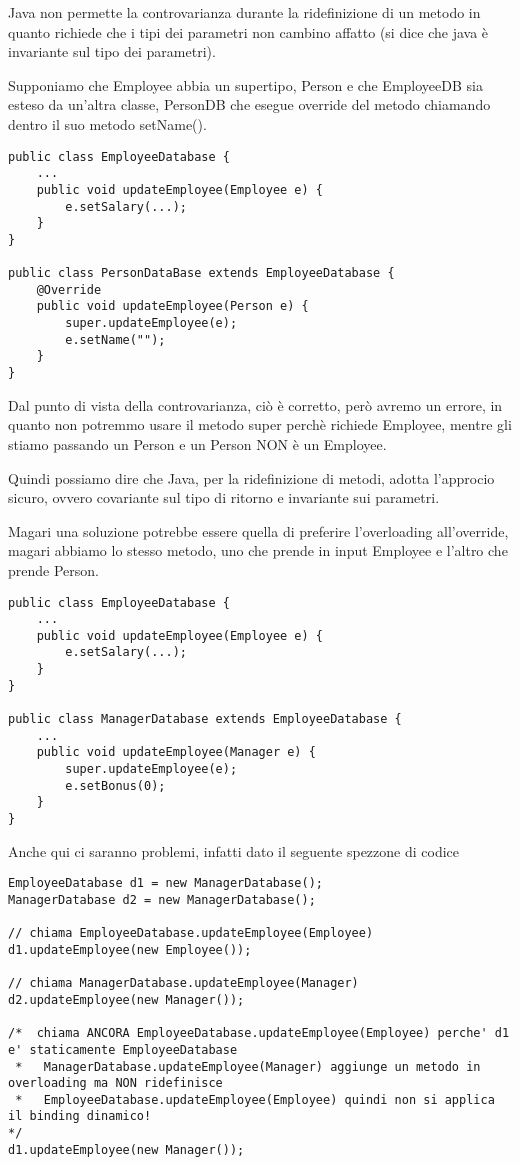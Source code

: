 Java non permette la controvarianza durante la ridefinizione di un metodo in quanto richiede che i tipi dei parametri non cambino affatto 
(si dice che java è invariante sul tipo dei parametri).

Supponiamo che Employee abbia un supertipo, Person e che EmployeeDB sia esteso da un'altra classe, PersonDB che esegue override del metodo chiamando dentro il suo 
metodo setName().

\begin{lstlisting}
public class EmployeeDatabase {
    ...
    public void updateEmployee(Employee e) {
        e.setSalary(...);
    }
}

public class PersonDataBase extends EmployeeDatabase {
    @Override
    public void updateEmployee(Person e) {
        super.updateEmployee(e);
        e.setName("");
    }
}
\end{lstlisting}

Dal punto di vista della controvarianza, ciò è corretto, però avremo un errore, in quanto non potremmo usare il metodo super perchè richiede Employee, mentre gli stiamo 
passando un Person e un Person NON è un Employee.

Quindi possiamo dire che Java, per la ridefinizione di metodi, adotta l'approcio sicuro, ovvero covariante sul tipo di ritorno e invariante sui parametri.

Magari una soluzione potrebbe essere quella di preferire l'overloading all'override, magari abbiamo lo stesso metodo, uno che prende in input Employee e l'altro che prende
Person.

\begin{lstlisting}
public class EmployeeDatabase {
    ...
    public void updateEmployee(Employee e) {
        e.setSalary(...);
    }
}

public class ManagerDatabase extends EmployeeDatabase {
    ...
    public void updateEmployee(Manager e) {
        super.updateEmployee(e);
        e.setBonus(0);
    }
}
\end{lstlisting}

Anche qui ci saranno problemi, infatti dato il seguente spezzone di codice

\begin{lstlisting}
EmployeeDatabase d1 = new ManagerDatabase();
ManagerDatabase d2 = new ManagerDatabase();

// chiama EmployeeDatabase.updateEmployee(Employee)
d1.updateEmployee(new Employee());

// chiama ManagerDatabase.updateEmployee(Manager)
d2.updateEmployee(new Manager());

/*  chiama ANCORA EmployeeDatabase.updateEmployee(Employee) perche' d1 e' staticamente EmployeeDatabase
 *   ManagerDatabase.updateEmployee(Manager) aggiunge un metodo in overloading ma NON ridefinisce 
 *   EmployeeDatabase.updateEmployee(Employee) quindi non si applica il binding dinamico!
*/
d1.updateEmployee(new Manager());
\end{lstlisting}

